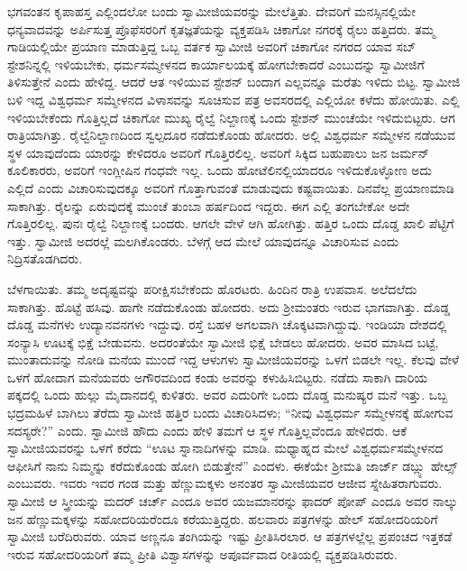  ಭಗವಂತನ ಕೃಪಾಹಸ್ತ ಎಲ್ಲಿಂದಲೋ ಬಂದು ಸ್ವಾಮೀಜಿಯವರನ್ನು ಮೇಲೆತ್ತಿತು. ದೇವರಿಗೆ ಮನಸ್ಸಿನಲ್ಲಿಯೇ ಧನ್ಯವಾದವನ್ನು ಅರ್ಪಿಸುತ್ತ ಪ್ರೊಫೆಸರರಿಗೆ ಕೃತಜ್ಞತೆಯನ್ನು ವ್ಯಕ್ತಪಡಿಸಿ ಚಿಕಾಗೋ ನಗರಕ್ಕೆ ರೈಲು ಹತ್ತಿದರು. ತಮ್ಮ ಗಾಡಿಯಲ್ಲಿಯೇ ಪ್ರಯಾಣ ಮಾಡುತ್ತಿದ್ದ ಒಬ್ಬ ವರ್ತಕ ಸ್ವಾಮೀಜಿ ಅವರಿಗೆ ಚಿಕಾಗೋ ನಗರದ ಯಾವ ಸಬ್ ಸ್ಟೇಶನಿನ್ನಲ್ಲಿ ಇಳಿಯಬೇಕು, ಧರ್ಮಸಮ್ಮೇಳನದ ಕಾರ್ಯಾಲಯಕ್ಕೆ ಹೋಗಬೇಕಾದರೆ ಎಂಬುದನ್ನು ಸ್ವಾಮೀಜಿಗೆ ತಿಳಿಸುತ್ತೇನೆ ಎಂದು ಹೇಳಿದ್ದ. ಆದರೆ ಆತ ಇಳಿಯುವ ಸ್ಟೇಶನ್ ಬಂದಾಗ ಎಲ್ಲವನ್ನೂ ಮರೆತು ಇಳಿದು ಬಿಟ್ಟ. ಸ್ವಾಮೀಜಿ ಬಳಿ ಇದ್ದ ವಿಶ್ವಧರ್ಮ ಸಮ್ಮೇಳನದ ವಿಳಾಸವನ್ನು ಸೂಚಿಸುವ ಪತ್ರ ಅವಸರದಲ್ಲಿ ಎಲ್ಲಿಯೋ ಕಳೆದು ಹೋಯಿತು. ಎಲ್ಲಿ ಇಳಿಯಬೇಕೆಂದು ಗೊತ್ತಿಲ್ಲದೆ ಚಿಕಾಗೋ ಮುಖ್ಯ ರೈಲ್ವೆ ನಿಲ್ದಾಣಕ್ಕೆ ಒಂದು ಸ್ಟೇಶನ್ ಮುಂಚೆಯೇ ಇಳಿದುಬಿಟ್ಟರು. ಆಗ ರಾತ್ರಿಯಾಗಿತ್ತು. ರೈಲ್ವೆ\break ನಿಲ್ದಾಣದಿಂದ ಸ್ವಲ್ಪದೂರ ನಡೆದುಕೊಂಡು ಹೋದರು. ಅಲ್ಲಿ ವಿಶ್ವಧರ್ಮ ಸಮ್ಮೇಳನ ನಡೆಯುವ ಸ್ಥಳ ಯಾವುದೆಂದು ಯಾರನ್ನು ಕೇಳಿದರೂ ಅವರಿಗೆ ಗೊತ್ತಿರಲಿಲ್ಲ. ಅವರಿಗೆ ಸಿಕ್ಕಿದ ಬಹುಪಾಲು ಜನ ಜರ್ಮನ್ ಕೂಲಿಕಾರರು, ಅವರಿಗೆ ಇಂಗ್ಲೀಷಿನ ಗಂಧವೇ ಇಲ್ಲ. ಒಂದು ಹೋಟೆಲಿನಲ್ಲಿಯಾದರೂ ಇಳಿದುಕೊಳ್ಳೋಣ ಅದು ಎಲ್ಲಿದೆ ಎಂದು ವಿಚಾರಿಸುವುದಕ್ಕೂ ಅವರಿಗೆ ಗೊತ್ತಾಗುವಂತೆ ಮಾಡುವುದು ಕಷ್ಟವಾಯಿತು. ದಿನವೆಲ್ಲ ಪ್ರಯಾಣಮಾಡಿ ಸಾಕಾಗಿತ್ತು. ರೈಲನ್ನು ಏರುವುದಕ್ಕೆ ಮುಂಚೆ ತುಂಬಾ ಹರ್ಷದಿಂದ ಇದ್ದರು. ಈಗ ಎಲ್ಲಿ ತಂಗಬೇಕೋ ಅದೇ ಗೊತ್ತಿರಲಿಲ್ಲ. ಪುನಃ ರೈಲ್ವೆ ನಿಲ್ದಾಣಕ್ಕೆ ಬಂದರು. ಆಗಲೇ ವೇಳೆ ಆಗಿ ಹೋಗಿತ್ತು. ಹತ್ತಿರ ಒಂದು ದೊಡ್ಡ ಖಾಲಿ ಪೆಟ್ಟಿಗೆ ಇತ್ತು. ಸ್ವಾಮೀಜಿ ಅದರಲ್ಲೆ ಮಲಗಿಕೊಂಡರು. ಬೆಳಗ್ಗೆ ಆದ ಮೇಲೆ ಯಾವುದನ್ನೂ ವಿಚಾರಿಸುವ ಎಂದು ನಿದ್ರಿಸತೊಡಗಿದರು. 

 ಬೆಳಗಾಯಿತು. ತಮ್ಮ ಅದೃಷ್ಟವನ್ನು ಪರೀಕ್ಷಿಸಬೇಕೆಂದು ಹೊರಟರು. ಹಿಂದಿನ ರಾತ್ರಿ ಉಪವಾಸ. ಅಲೆದಲೆದು ಸಾಕಾಗಿತ್ತು. ಹೊಟ್ಟೆ ಹಸಿವು. ಹಾಗೇ ನಡೆದುಕೊಂಡು ಹೋದರು. ಅದು ಶ‍್ರೀಮಂತರು ಇರುವ ಭಾಗವಾಗಿತ್ತು. ದೊಡ್ಡ ದೊಡ್ಡ ಮನೆಗಳು ಉದ್ಯಾನವನಗಳು ಇದ್ದುವು. ರಸ್ತೆ ಬಹಳ ಅಗಲವಾಗಿ ಚೊಕ್ಕಟವಾಗಿದ್ದುವು. ಇಂಡಿಯಾ ದೇಶದಲ್ಲಿ ಸಂನ್ಯಾಸಿ ಊಟಕ್ಕೆ ಭಿಕ್ಷೆ ಬೇಡುವನು. ಅದರಂತೆಯೇ ಸ್ವಾಮೀಜಿ ಭಿಕ್ಷೆ ಬೇಡಲು ಹೋದರು. ಅವರ ಮಾಸಿದ ಬಟ್ಟೆ, ಮುಂತಾದುವನ್ನು ನೋಡಿ ಮನೆಯ ಮುಂದೆ ಇದ್ದ ಆಳುಗಳು ಸ್ವಾಮೀಜಿಯವರನ್ನು ಒಳಗೆ ಬಿಡಲೇ ಇಲ್ಲ. ಕೆಲವು ವೇಳೆ ಒಳಗೆ ಹೋದಾಗ ಮನೆಯವರು ಅಗೌರವದಿಂದ ಕಂಡು ಅವರನ್ನು ಕಳುಹಿಸಿಬಿಟ್ಟರು. ನಡೆದು ಸಾಕಾಗಿ ದಾರಿಯ ಪಕ್ಕದಲ್ಲಿ ಒಂದು ಹುಲ್ಲು ಮೈದಾನದಲ್ಲಿ ಕುಳಿತರು. ಅವರ ಎದುರಿಗೇ ಒಂದು ದೊಡ್ಡ ಮನುಷ್ಯರ ಮನೆ ಇತ್ತು. ಒಬ್ಬ ಭದ್ರಮಹಿಳೆ ಬಾಗಿಲು ತೆರೆದು ಸ್ವಾಮೀಜಿ ಹತ್ತಿರ ಬಂದು ವಿಚಾರಿಸಿದಳು; “ನೀವು ವಿಶ್ವಧರ್ಮ ಸಮ್ಮೇಳನಕ್ಕೆ ಹೋಗುವ ಸದಸ್ಯರೇ?” ಎಂದು. ಸ್ವಾಮೀಜಿ ಹೌದು ಎಂದು ಹೇಳಿ ತಮಗೆ ಆ ಸ್ಥಳ ಗೊತ್ತಿಲ್ಲವೆಂದೂ ಹೇಳಿದರು. ಆಕೆ ಸ್ವಾಮೀಜಿಯವರನ್ನು ಒಳಗೆ ಕರೆದು “ಊಟ ಸ್ನಾನಾದಿಗಳನ್ನು ಮಾಡಿ. ಮಧ್ಯಾಹ್ನದ ಮೇಲೆ ವಿಶ್ವಧರ್ಮಸಮ್ಮೇಳನದ ಆಫೀಸಿಗೆ ನಾನು ನಿಮ್ಮನ್ನು ಕರೆದುಕೊಂಡು ಹೋಗಿ ಬಿಡುತ್ತೇನೆ” ಎಂದಳು. ಈಕೆಯೇ ಶ‍್ರೀಮತಿ ಜಾರ್ಜ್ ಡಬ್ಲ್ಯು ಹೇಲ್ಸ್ ಎಂಬುವರು. ಇವರು ಇವರ ಗಂಡ ಮತ್ತು ಹೆಣ್ಣುಮಕ್ಕಳು ಅನಂತರ ಸ್ವಾಮೀಜಿಯವರ ಆಜೀವ ಸ್ನೇಹಿತರಾಗುವರು. ಸ್ವಾಮೀಜಿ ಆ ಸ್ತ್ರೀಯನ್ನು ಮದರ್ ಚರ್ಚ್ ಎಂದೂ ಅವರ ಯಜಮಾನರನ್ನು ಫಾದರ್ ಪೋಪ್ ಎಂದೂ ಅವರ ನಾಲ್ಕು ಜನ ಹೆಣ್ಣುಮಕ್ಕಳನ್ನು ಸಹೋದರಿಯರೆಂದೂ ಕರೆಯುತ್ತಿದ್ದರು. ಹಲವಾರು ಪತ್ರಗಳನ್ನು ಹೇಲ್ ಸಹೋದರಿಯರಿಗೆ ಸ್ವಾಮೀಜಿ ಬರೆದಿರುವರು. ಯಾವ ಅಣ್ಣನೂ ತಂಗಿಯನ್ನು ಇಷ್ಟು ಪ್ರೀತಿಸಿರಲಾರ. ಆ ಪತ್ರಗಳಲ್ಲೆಲ್ಲ ಪ್ರಪಂಚದ ಇತ್ತಕಡೆ ಇರುವ ಸಹೋದರಿಯರಿಗೆ ತಮ್ಮ ಪ್ರೀತಿ ವಿಶ್ವಾಸಗಳನ್ನು ಅಪೂರ್ವವಾದ ರೀತಿಯಲ್ಲಿ ವ್ಯಕ್ತಪಡಿಸಿರುವರು. 

